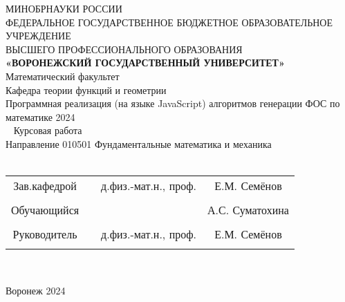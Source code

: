 
\begin{center}
	\hfill \break
	\large{МИНОБРНАУКИ РОССИИ}\\
	\footnotesize{ФЕДЕРАЛЬНОЕ ГОСУДАРСТВЕННОЕ БЮДЖЕТНОЕ ОБРАЗОВАТЕЛЬНОЕ УЧРЕЖДЕНИЕ}\\
	\footnotesize{ВЫСШЕГО ПРОФЕССИОНАЛЬНОГО ОБРАЗОВАНИЯ}\\
	\small{\textbf{«ВОРОНЕЖСКИЙ ГОСУДАРСТВЕННЫЙ УНИВЕРСИТЕТ»}}\\
	\hfill \break
	\normalsize{Математический факультет}\\
	\hfill \break
	\normalsize{Кафедра теории функций и геометрии}\\
	\hfill\break
	\hfill \break
	\hfill \break
	\hfill \break
	\large{Программная реализация (на языке JavaScript) алгоритмов генерации ФОС по математике 2024}\\
	\hfill \break
	\hfill \break
	\hfill \break\
	\hfill \break
	\hfill \break
	\normalsize{Курсовая работа\\
		\hfill \break
		Направление  010501 Фундаментальные математика и механика\\

		\hfill \break
	}\\
	\hfill \break
	\hfill \break
\end{center}
\hfill \break

\normalsize{
	\begin{tabular}{cccc}
		Зав.кафедрой & \underline{\hspace{3cm}} & д.физ.-мат.н.,  проф. & Е.М. Семёнов    \\\\
		Обучающийся  & \underline{\hspace{3cm}} &                       & А.С. Суматохина \\\\
		Руководитель & \underline{\hspace{3cm}} & д.физ.-мат.н.,  проф. & Е.М. Семёнов    \\\\
	\end{tabular}
}\\
\hfill \break
\hfill \break
\begin{center} Воронеж 2024 \end{center}
\thispagestyle{empty} %


